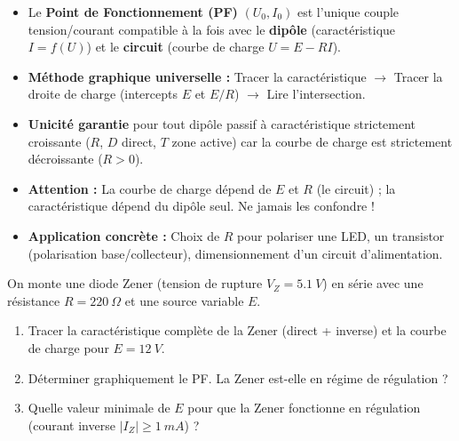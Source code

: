 \documentclass[11pt]{article}
\newcounter{popsec}
\newcounter{popsub}
\newcommand{\courssub}[1]{%
  \stepcounter{popsub}%
  \par\vspace{9pt}\noindent{\popxbold\fontsize{11.5}{13}\selectfont\color{popink}{\color{poporange}\thepopsec.\thepopsub}\hspace{6pt}#1}\par\nopagebreak\vspace{4pt}
}
\begin{document}
\courssub{Synthèse de la section}

\begin{aretenir}
\begin{itemize}
    \item Le \textbf{Point de Fonctionnement (PF)} $(U_0, I_0)$ est l'unique couple tension/courant compatible à la fois avec le \textbf{dipôle} (caractéristique $I=f(U)$) et le \textbf{circuit} (courbe de charge $U = E - RI$).
    \item \textbf{Méthode graphique universelle :} Tracer la caractéristique $\rightarrow$ Tracer la droite de charge (intercepts $E$ et $E/R$) $\rightarrow$ Lire l'intersection.
    \item \textbf{Unicité garantie} pour tout dipôle passif à caractéristique strictement croissante ($R$, $D$ direct, $T$ zone active) car la courbe de charge est strictement décroissante ($R>0$).
    \item \textbf{Attention :} La courbe de charge dépend de $E$ et $R$ (le circuit) ; la caractéristique dépend du dipôle seul. Ne jamais les confondre !
    \item \textbf{Application concrète :} Choix de $R$ pour polariser une LED, un transistor (polarisation base/collecteur), dimensionnement d'un circuit d'alimentation.
\end{itemize}
\end{aretenir}

\begin{exercice}
On monte une diode Zener (tension de rupture $V_Z = \SI{5,1}{V}$) en série avec une résistance $R = \SI{220}{\Omega}$ et une source variable $E$.
\begin{enumerate}
    \item Tracer la caractéristique complète de la Zener (direct + inverse) et la courbe de charge pour $E = \SI{12}{V}$.
    \item Déterminer graphiquement le PF. La Zener est-elle en régime de régulation ?
    \item Quelle valeur minimale de $E$ pour que la Zener fonctionne en régulation (courant inverse $|I_Z| \ge \SI{1}{mA}$) ?
\end{enumerate}
\end{exercice}
\end{document}
